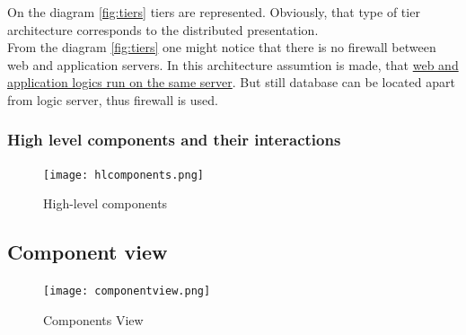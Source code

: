 \documentclass[12pt, letterpaper]{article}
\begin{document}
On the diagram \ref{fig:tiers} tiers are represented. Obviously, that type of tier architecture corresponds to the distributed presentation. \\
From the diagram \ref{fig:tiers} one might notice that there is no firewall between web and application servers. In this architecture assumtion is made, that \underline{web and application logics run on the same server}. But still database can be located apart from logic server, thus firewall is used. 


\subsubsection{High level components and their interactions}

\begin{figure}[H]
\centering
\texttt{[image: hlcomponents.png]}
\caption{High-level components}
\label{fig:hlcomp}
\end{figure}

\subsection{Component view}

\begin{figure}[H]
\centering
\texttt{[image: componentview.png]} 
\caption{Components View}
\label{fig:compview}
\end{figure}
\end{document}
